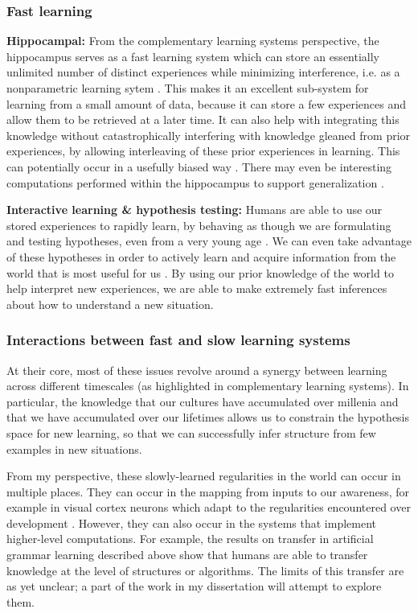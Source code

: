 \documentclass[11pt]{article}
\begin{document}
\subsubsection{Fast learning}
\textbf{Hippocampal:} From the complementary learning systems perspective, the hippocampus serves as a fast learning system which can store an essentially unlimited number of distinct experiences while minimizing interference, i.e. as a nonparametric learning sytem \citep{Kumaran2016}. This makes it an excellent sub-system for learning from a small amount of data, because it can store a few experiences and allow them to be retrieved at a later time. It can also help with integrating this knowledge without catastrophically interfering \citep{McCloskey1989} with knowledge gleaned from prior experiences, by allowing interleaving of these prior experiences in learning. This can potentially occur in a usefully biased way \citep{Kumaran2016}. There may even be interesting computations performed within the hippocampus to support generalization \citep{Kumaran2012}. \par 
\textbf{Interactive learning \& hypothesis testing:} Humans are able to use our stored experiences to rapidly learn, by behaving as though we are formulating and testing hypotheses, even from a very young age \citep{Sobel2004, Gopnik2014}. We can even take advantage of these hypotheses in order to actively learn and acquire information from the world that is most useful for us \citep[e.g.]{Markant2014a}. By using our prior knowledge of the world to help interpret new experiences, we are able to make extremely fast inferences about how to understand a new situation. \par


\subsubsection{Interactions between fast and slow learning systems}
At their core, most of these issues revolve around a synergy between learning across different timescales (as highlighted in complementary learning systems). In particular, the knowledge that our cultures have accumulated over millenia and that we have accumulated over our lifetimes allows us to constrain the hypothesis space for new learning, so that we can successfully infer structure from few examples in new situations. \par 
From my perspective, these slowly-learned regularities in the world can occur in multiple places. They can occur in the mapping from inputs to our awareness, for example in visual cortex neurons which adapt to the regularities encountered over development \citep{Barlow1975}. However, they can also occur in the systems that implement higher-level computations. For example, the results on transfer in artificial grammar learning described above \citep[e.g.]{Tunney2001} show that humans are able to transfer knowledge at the level of structures or algorithms. The limits of this transfer are as yet unclear; a part of the work in my dissertation will attempt to explore them. \par  
\end{document}
